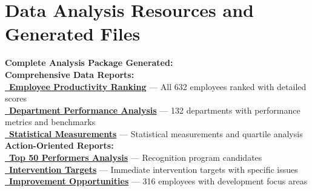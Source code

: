 \documentclass[12pt,a4paper]{article}
\begin{document}
\newpage
\section{Data Analysis Resources and Generated Files}

\begin{resourcebox}
\textbf{\faDownload \quad Complete Analysis Package Generated:}\\[0.8em]

\textbf{Comprehensive Data Reports:}\\
\textcolor{primaryGold}{\href{https://fixysaskihumorizijuv.supabase.co/storage/v1/object/public/research-files/10c10921-f037-476a-a3e2-443b4f24dacd-complete_employee_productivity_ranking.csv?download=}{{\normalsize\faTrophy}\, \textbf{Employee Productivity Ranking}}} — All 632 employees ranked with detailed scores\\
\textcolor{primaryBlue}{\href{https://fixysaskihumorizijuv.supabase.co/storage/v1/object/public/research-files/c063886e-6e70-476c-b87d-de0dc3c0f2b9-comprehensive_department_analysis.csv?download=}{{\normalsize\faBuilding}\, \textbf{Department Performance Analysis}}} — 132 departments with performance metrics and benchmarks\\
\textcolor{accentBlue}{\href{https://fixysaskihumorizijuv.supabase.co/storage/v1/object/public/research-files/6bc2ed7c-9918-4171-9b19-2d31fb67df5d-advanced_statistical_analysis.csv?download=}{{\normalsize\faChartLine}\, \textbf{Statistical Measurements}}} — Statistical measurements and quartile analysis\\

\textbf{Action-Oriented Reports:}\\
\textcolor{accentGold}{\href{https://fixysaskihumorizijuv.supabase.co/storage/v1/object/public/research-files/d7107b00-7e41-4006-a14b-1bd782f73914-top_50_performers_detailed.csv?download=}{{\normalsize\faMedal}\, \textbf{Top 50 Performers Analysis}}} — Recognition program candidates\\
\textcolor{dangerRed}{\href{https://fixysaskihumorizijuv.supabase.co/storage/v1/object/public/research-files/82454a51-b4a9-4f64-b213-29ce048aad16-bottom_50_performers_detailed.csv?download=}{{\normalsize\faExclamationTriangle}\, \textbf{Intervention Targets}}} — Immediate intervention targets with specific issues\\
\textcolor{successGreen}{\href{https://fixysaskihumorizijuv.supabase.co/storage/v1/object/public/research-files/03f82764-e85b-4f1f-b127-04cb7347bd2b-improvement_opportunities_detailed.csv?download=}{{\normalsize\faCheckCircle}\, \textbf{Improvement Opportunities}}} — 316 employees with development focus areas\\[0.5em]


\end{resourcebox}
\end{document}
